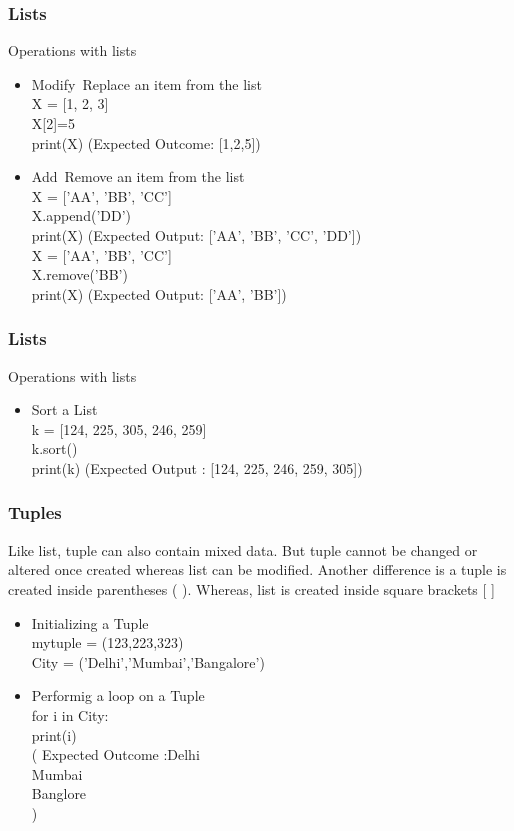 \documentclass{beamer}
\theoremstyle{plain}
\theoremstyle{definition}
\begin{document}
\begin{frame}
      \frametitle{Lists}
      Operations with lists
			\begin{itemize}
			\item Modify\ Replace an item from the list \\
			 X = [1, 2, 3] \\
             X[2]=5 \\
             print(X) (Expected Outcome: [1,2,5])
			
			\item Add\ Remove an item from the list\\
              X = ['AA', 'BB', 'CC'] \\
X.append('DD')\\
print(X) (Expected Output: ['AA', 'BB', 'CC', 'DD']) \\
 X = ['AA', 'BB', 'CC'] \\
X.remove('BB') \\
print(X) (Expected Output: ['AA', 'BB'])\\
		 \end{itemize}
			

\end{frame}


\begin{frame}
      \frametitle{Lists}
      Operations with lists
			\begin{itemize}
			\item Sort a List \\
			      k = [124, 225, 305, 246, 259]\\
    k.sort() \\
    print(k) (Expected Output : [124, 225, 246, 259, 305])


			
		 \end{itemize}
			

\end{frame}




\begin{frame}
      \frametitle{Tuples}
      Like list, tuple can also contain mixed data. But tuple cannot be changed or altered once created whereas list can be modified. Another difference is a tuple is created inside parentheses ( ). Whereas, list is created inside square brackets [ ]
	\begin{itemize}
			\item Initializing a Tuple \\
			 mytuple = (123,223,323) \\
            City = ('Delhi','Mumbai','Bangalore') \\
			\item Performig a loop on a Tuple\\
			 for i in City: \\
              print(i) \\
			(
			Expected Outcome :Delhi \\
			Mumbai \\
			Banglore \\
			)
		 \end{itemize}
			

\end{frame}
\end{document}

